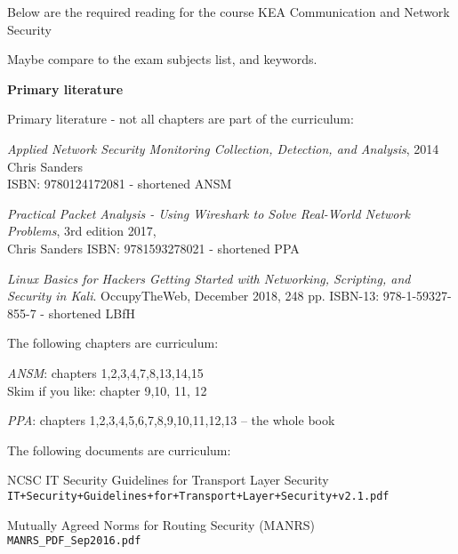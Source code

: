 \documentclass[a4paper,11pt,notitlepage,landscape]{report}
\begin{document}
{}


\normal

Below are the required reading for the course KEA Communication and Network Security \the\year

Maybe compare to the exam subjects list, and keywords.


{\bf Primary literature}

Primary literature - not all chapters are part of the curriculum:
\begin{list2}
\item \emph{Applied Network Security Monitoring Collection, Detection, and Analysis}, 2014 Chris Sanders \\
ISBN: 9780124172081 - shortened ANSM
\item \emph{Practical Packet Analysis - Using Wireshark to Solve Real-World Network Problems}, 3rd edition 2017, \\
Chris Sanders ISBN: 9781593278021 - shortened PPA
\item \emph{Linux Basics for Hackers Getting Started with Networking, Scripting, and Security in Kali}. OccupyTheWeb, December 2018, 248 pp. ISBN-13: 978-1-59327-855-7 - shortened LBfH
\end{list2}


The following chapters are curriculum:

\begin{list2}
\item \emph{ANSM}: chapters 1,2,3,4,7,8,13,14,15\\
Skim if you like: chapter 9,10, 11, 12
\item \emph{PPA}: chapters 1,2,3,4,5,6,7,8,9,10,11,12,13 -- the whole book

\end{list2}

The following documents are curriculum:
\begin{list2}
\item NCSC IT Security Guidelines for Transport Layer Security\\
\verb_IT+Security+Guidelines+for+Transport+Layer+Security+v2.1.pdf_
\item Mutually Agreed Norms for Routing Security (MANRS)\\
\verb+MANRS_PDF_Sep2016.pdf+
\end{list2}
\end{document}
